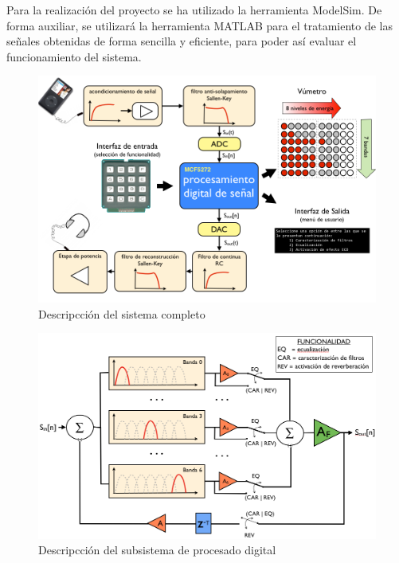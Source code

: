 \documentclass[a4paper,12pt]{article}
\begin{document}
Para la realización del proyecto se ha utilizado la herramienta ModelSim. De forma auxiliar, se utilizará la herramienta MATLAB para el tratamiento de las señales obtenidas de forma sencilla y eficiente, para poder así evaluar el funcionamiento del sistema.

\begin{figure}[hbt]
\includegraphics[width=\textwidth]{img/system_description.png} 
\caption{Descripcción del sistema completo} \label{fig:sysdesc}
\end{figure}

\begin{figure}[hbt]
\includegraphics[width=\textwidth]{img/digital_proc.png} 
\caption{Descripcción del subsistema de procesado digital} \label{fig:digproc}
\end{figure}
\end{document}
